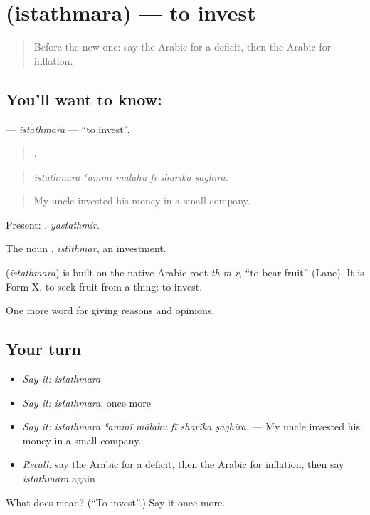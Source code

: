 \section[\texorpdfstring{\ar{استثمر} (istathmara)}{استثمر (istathmara)}]{ (istathmara) — to invest}

\label{lesson:AR-C383-istathmara}



\begin{quote}
Before the new one: say the Arabic for a deficit, then the Arabic for inflation.
\end{quote}

\subsection*{You'll want to know: }
\textbf{} — \emph{istathmara} — \textquotedblleft{}to invest\textquotedblright{}.

\begin{quote}
     .
\end{quote}

\begin{quote}
\emph{istathmara ʿammī mālahu fī sharika ṣaghīra.}
\end{quote}

\begin{quote}
My uncle invested his money in a small company.
\end{quote}

Present: , \emph{yastathmir}.

The noun , \emph{istithmār}, an investment.

\begin{cousinweb}
\textbf{} (\emph{istathmara}) is built on the native Arabic root \emph{th-m-r}, \textquotedblleft{}to bear fruit\textquotedblright{} (Lane). It is Form X, to seek fruit from a thing: to invest.
\end{cousinweb}

\begin{grammarlens}[title={What you've built}]
One more word for giving reasons and opinions.
\end{grammarlens}

\subsection*{Your turn}
\begin{itemize}
\raggedright
  \item \emph{Say it:} \emph{istathmara}
  \item \emph{Say it:} \emph{istathmara}, once more
  \item \emph{Say it:} \emph{istathmara ʿammī mālahu fī sharika ṣaghīra.} — My uncle invested his money in a small company.
  \item \emph{Recall:} say the Arabic for a deficit, then the Arabic for inflation, then say \emph{istathmara} again
\end{itemize}

\begin{tcolorbox}[breakable,colback=teal!4,colframe=teal!35!black,title={Before you move on}]
What does  mean? (\textquotedblleft{}To invest\textquotedblright{}.) Say it once more.
\end{tcolorbox}

